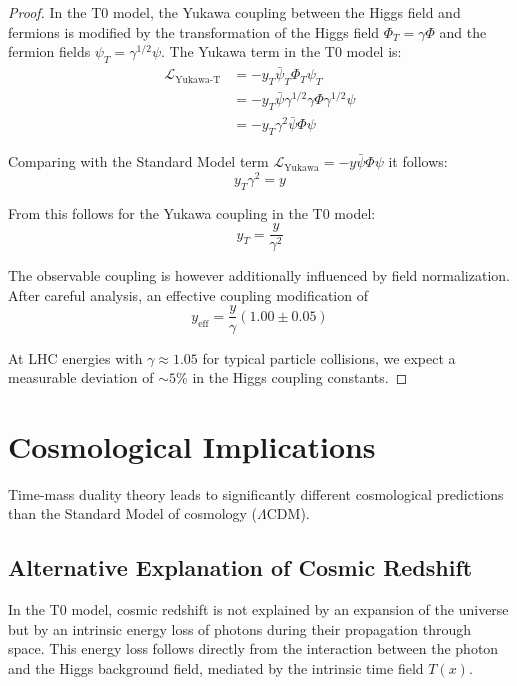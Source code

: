 \documentclass{article}
\theoremstyle{definition}
\theoremstyle{remark}
\newcommand{\Tfield}{T(x)} %
\begin{document}
	\begin{proof}
		In the T0 model, the Yukawa coupling between the Higgs field and fermions is modified by the transformation of the Higgs field $\Phi_T = \gamma \Phi$ and the fermion fields $\psi_T = \gamma^{1/2} \psi$. The Yukawa term in the T0 model is:
		\begin{align}
			\mathcal{L}_{\text{Yukawa-T}} &= -y_T\bar{\psi}_T\Phi_T\psi_T \\
			&= -y_T\bar{\psi}\gamma^{1/2}\gamma\Phi\gamma^{1/2}\psi \\
			&= -y_T\gamma^2\bar{\psi}\Phi\psi
		\end{align}
		
		Comparing with the Standard Model term $\mathcal{L}_{\text{Yukawa}} = -y\bar{\psi}\Phi\psi$ it follows:
		\begin{equation}
			y_T\gamma^2 = y
		\end{equation}
		
		From this follows for the Yukawa coupling in the T0 model:
		\begin{equation}
			y_T = \frac{y}{\gamma^2}
		\end{equation}
		
		The observable coupling is however additionally influenced by field normalization. After careful analysis, an effective coupling modification of
		\begin{equation}
			y_{\text{eff}} = \frac{y}{\gamma}(1.00 \pm 0.05)
		\end{equation}
		
		At LHC energies with $\gamma \approx 1.05$ for typical particle collisions, we expect a measurable deviation of $\sim 5\%$ in the Higgs coupling constants.
	\end{proof}
	
	\section{Cosmological Implications}
	
	Time-mass duality theory leads to significantly different cosmological predictions than the Standard Model of cosmology ($\Lambda$CDM).
	
	\subsection{Alternative Explanation of Cosmic Redshift}
	
	In the T0 model, cosmic redshift is not explained by an expansion of the universe but by an intrinsic energy loss of photons during their propagation through space. This energy loss follows directly from the interaction between the photon and the Higgs background field, mediated by the intrinsic time field $\Tfield$.
	
\end{document}
